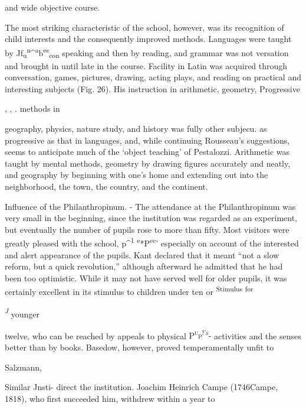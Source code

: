 \documentclass[]{book}
\begin{document}
and wide objective course.

The most striking characteristic of the school, however, was its recognition of child interests and the consequently improved methods. Languages were taught by Jf\textsubscript{u}\textsuperscript{n}\^{}\textsuperscript{a}b\textsuperscript{es}\textsubscript{con} speaking and then by reading, and grammar was not versation and brought in until late in the course. Facility in Latin was acquired through conversation, games, pictures, drawing, acting plays, and reading on practical and interesting subjects (Fig. 26). His instruction in arithmetic, geometry, Progressive

, , . methods in

geography, physics, nature study, and history was fully other subjecu. as progressive as that in languages, and, while continuing Rousseau's suggestions, seems to anticipate much of the `object teaching' of Pestalozzi. Arithmetic was taught by mental methods, geometry by drawing figures accurately and neatly, and geography by beginning with one's home and extending out into the neighborhood, the town, the country, and the continent.

Influence of the Philanthropinum. - The attendance at the Philanthropinum was very small in the beginning, since the institution was regarded as an experiment, but eventually the number of pupils rose to more than fifty. Most visitors were greatly pleased with the school, p\^{}\textsuperscript{1} \textsuperscript{e}*P\textsuperscript{ec}' especially on account of the interested and alert appearance of the pupils. Kant declared that it meant ``not a slow reform, but a quick revolution,'' although afterward he admitted that he had been too optimistic. While it may not have served well for older pupils, it was certainly excellent in its stimulus to children under ten or \textsuperscript{Stimulus} \textsuperscript{for}

\emph{\textsuperscript{J}} younger

twelve, who can be reached by appeals to physical \textsc{P\textsuperscript{u}p\textsuperscript{!'s}- }activities and the senses better than by books. Basedow, however, proved temperamentally unfit to

Salzmann,

Similar Jnsti- direct the institution. Joachim Heinrich Campe (1746Campe, 1818), who first succeeded him, withdrew within a year to
\end{document}
